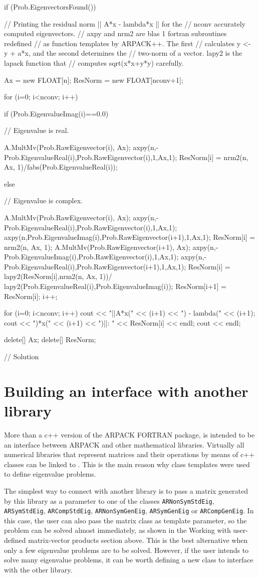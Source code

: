 \begin{cppcode}
{	if (Prob.EigenvectorsFound()) {
		
		// Printing the residual norm || A*x - lambda*x || for the
		// nconv accurately computed eigenvectors. 
		// axpy and nrm2 are blas 1 fortran subroutines redefined
		// as function templates by ARPACK++. The first 
		// calculates y <- y + a*x, and the second determines the 
		// two-norm of a vector. lapy2 is the lapack function that 
		// computes sqrt(x*x+y*y) carefully.
		
		Ax      = new FLOAT[n];
		ResNorm = new FLOAT[nconv+1];
		
		for (i=0; i<nconv; i++)
		{
			if (Prob.EigenvalueImag(i)==0.0) { // Eigenvalue is real.
				
				A.MultMv(Prob.RawEigenvector(i), Ax); 
				axpy(n,-Prob.EigenvalueReal(i),Prob.RawEigenvector(i),1,Ax,1);
				ResNorm[i] = nrm2(n, Ax, 1)/fabs(Prob.EigenvalueReal(i));
			}
			else { // Eigenvalue is complex.
				
				A.MultMv(Prob.RawEigenvector(i), Ax);
				axpy(n,-Prob.EigenvalueReal(i),Prob.RawEigenvector(i),1,Ax,1);
				axpy(n,Prob.EigenvalueImag(i),Prob.RawEigenvector(i+1),1,Ax,1);
				ResNorm[i] = nrm2(n, Ax, 1);
				A.MultMv(Prob.RawEigenvector(i+1), Ax);
				axpy(n,-Prob.EigenvalueImag(i),Prob.RawEigenvector(i),1,Ax,1);
				axpy(n,-Prob.EigenvalueReal(i),Prob.RawEigenvector(i+1),1,Ax,1);
				ResNorm[i] = lapy2(ResNorm[i],nrm2(n, Ax, 1))/
				lapy2(Prob.EigenvalueReal(i),Prob.EigenvalueImag(i));
				ResNorm[i+1] = ResNorm[i];
				i++;
			}
		}
		
		for (i=0; i<nconv; i++) {
			cout << "||A*x(" << (i+1) << ") - lambda(" << (i+1);
			cout << ")*x(" << (i+1) << ")||: " << ResNorm[i] << endl;
		}
		cout << endl;
		
		delete[] Ax;
		delete[] ResNorm;
	}
} // Solution
\end{cppcode}

\section{Building an interface with another library}

More than a c++ version of the ARPACK FORTRAN package, \ARPP{} is intended to be an interface between ARPACK and other mathematical libraries. Virtually all numerical libraries that represent matrices and their operations by means of c++ classes can be linked to \ARPP{}. This is the main reason why class templates were used to define eigenvalue problems.

The simplest way to connect \ARPP{} with another library is to pass a matrix generated by this library as a parameter to one of the classes \texttt{ARNonSymStdEig}, \texttt{ARSymStdEig}, \texttt{ARCompStdEig}, \texttt{ARNonSymGenEig}, \texttt{ARSymGenEig} or \texttt{ARCompGenEig}. In this case, the user can also pass the matrix class as template parameter, so the problem can be solved almost immediately, as shown in the Working with user-defined matrix-vector products section above. This is the best alternative when only a few eigenvalue problems are to be solved. However, if the user intends to solve many eigenvalue problems, it can be worth defining a new class to interface \ARPP{} with the other library.

